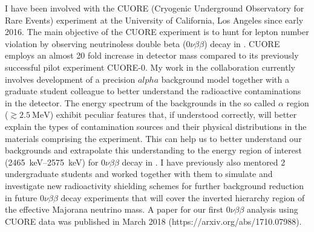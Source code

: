 \documentclass[10pt]{article} %
\begin{document}
I have been involved with the CUORE (Cryogenic Underground Observatory for Rare
Events) experiment at the University of California, Los Angeles since early
2016. The main objective of the CUORE experiment is to hunt for lepton number
violation by observing neutrinoless double beta ($0\nu\beta\beta$) decay in
. CUORE employs an almost 20 fold increase in detector mass
compared to its previously successful pilot experiment CUORE-0. My work in the
collaboration currently involves development of a precision $alpha$ background
model together with a graduate student colleague to better understand the
radioactive contaminations in the detector. The energy spectrum of the
backgrounds in the so called $\alpha$ region ($\gtrsim
\SI{2.5}{\mega\electronvolt}$) exhibit peculiar features that, if understood
correctly, will better explain the types of contamination sources and their
physical distributions in the materials comprising the experiment. This can
help us to better understand our backgrounds and extrapolate this understanding
to the energy region of interest (\SIrange{2465}{2575}{\kilo\electronvolt}) for
$0\nu\beta\beta$ decay in . I have previously also mentored 2
undergraduate students and worked together with them to simulate and
investigate new radioactivity shielding schemes for further background
reduction in future $0\nu\beta\beta$ decay experiments that will cover the
inverted hierarchy region of the effective Majorana neutrino mass. A paper for
our first $0\nu\beta\beta$ analysis using CUORE data was published in March
2018 (https://arxiv.org/abs/1710.07988).


\end{document}
